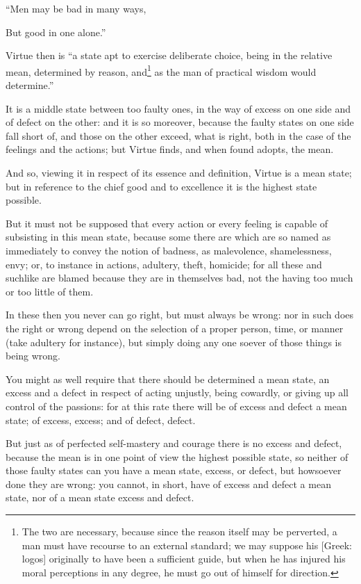 “Men may be bad in many ways,

But good in one alone.”


Virtue then is “a state apt to exercise deliberate choice, being in the
relative mean, determined by reason, and\footnote{The two are necessary, because since the reason itself may be perverted, a man
must have recourse to an external standard; we may suppose his [Greek: logos]
originally to have been a sufficient guide, but when he has injured his moral
perceptions in any degree, he must go out of himself for direction.}
as the man of practical wisdom would determine.”

It is a middle state between too faulty ones, in the way of excess on one side
and of defect on the other: and it is so moreover, because the faulty states on
one side fall short of, and those on the other exceed, what is right, both in
the case of the feelings and the actions; but Virtue finds, and when found
adopts, the mean.

And so, viewing it in respect of its essence and definition, Virtue is a mean
state; but in reference to the chief good and to excellence it is the highest
state possible.

But it must not be supposed that every action or every feeling is capable of
subsisting in this mean state, because some there are which are so named as
immediately to convey the notion of badness, as malevolence, shamelessness,
envy; or, to instance in actions, adultery, theft, homicide; for all these and
suchlike are blamed because they are in themselves bad, not the having too much
or too little of them.

In these then you never can go right, but must always be wrong: nor in such
does the right or wrong depend on the selection of a proper person, time, or
manner (take adultery for instance), but simply doing any one soever of those
things is being wrong.

You might as well require that there should be determined a mean state, an
excess and a defect in respect of acting unjustly, being cowardly, or giving up
all control of the passions: for at this rate there will be of excess and
defect a mean state; of excess, excess; and of defect, defect.

But just as of perfected self-mastery and courage there is no excess and
defect, because the mean is in one point of view the highest possible state, so
neither of those faulty states can you have a mean state, excess, or defect,
but howsoever done they are wrong: you cannot, in short, have of excess and
defect a mean state, nor of a mean state excess and defect.

